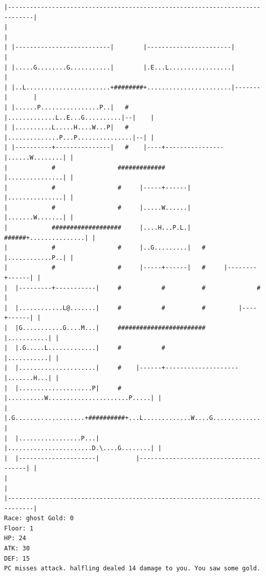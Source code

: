 \documentclass[11pt]{article}
\theoremstyle{plain}
\begin{document}
\begin{Verbatim}[fontsize=\scriptsize]
|-----------------------------------------------------------------------------|
|                                                                             |
| |--------------------------|        |-----------------------|               |
| |.....G........G...........|        |.E...L.................|               |
| |..L.......................+########+.......................|-------|       |
| |......P................P..|   #    |.............L..E...G..........|--|    |
| |..........L.....H....W...P|   #    |..............P...P...............|--| |
| |----------+---------------|   #    |----+----------------|......W........| |
|            #                 #############                |...............| |
|            #                 #     |-----+------|         |...............| |
|            #                 #     |.....W......|         |.......W.......| |
|            ###################     |....H...P.L.|   ######+...............| |
|            #                 #     |..G.........|   #     |............P..| |
|            #                 #     |-----+------|   #     |--------+------| |
|  |---------+-----------|     #           #          #              #        |
|  |............L@.......|     #           #          #         |----+------| |
|  |G...........G....M...|     ########################         |...........| |
|  |.G.....L.............|     #           #                    |...........| |
|  |.....................|     #    |------+--------------------|.......H...| |
|  |....................P|     #    |..........W......................P.....| |
|  |.G...................+##########+...L.............W....G................| |
|  |.................P...|          |.......................D.\....G........| |
|  |---------------------|          |---------------------------------------| |
|                                                                             |
|-----------------------------------------------------------------------------|
Race: ghost Gold: 0                                                    Floor: 1
HP: 24
ATK: 30
DEF: 15
PC misses attack. halfling dealed 14 damage to you. You saw some gold. 
\end{Verbatim}
\end{document}
